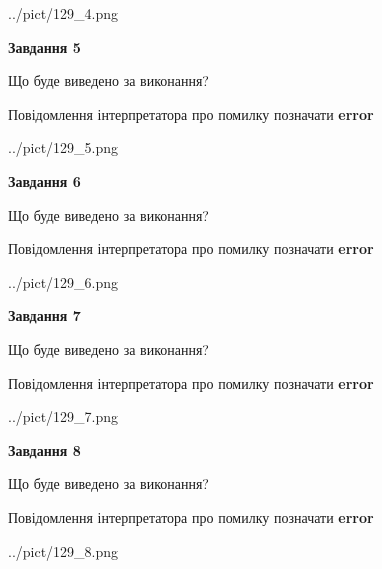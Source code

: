 \documentclass[12pt, ukrainian]{article}
\begin{document}
{\begin{center}
	{../pict/129_4.png}
\end{center}
\newpage

{\begin {center}\textbf{Завдання 5}\end {center}}\par
Що буде виведено за виконання? \par
Повідомлення інтерпретатора про помилку позначати \textbf{error}

\begin{center}
	{../pict/129_5.png}
\end{center}
\newpage

{\begin {center}\textbf{Завдання 6}\end {center}}\par
Що буде виведено за виконання? \par
Повідомлення інтерпретатора про помилку позначати \textbf{error}

\begin{center}
	{../pict/129_6.png}
\end{center}
\newpage

{\begin {center}\textbf{Завдання 7}\end {center}}\par
Що буде виведено за виконання? \par
Повідомлення інтерпретатора про помилку позначати \textbf{error}

\begin{center}
	{../pict/129_7.png}
\end{center}
\newpage

{\begin {center}\textbf{Завдання 8}\end {center}}\par
Що буде виведено за виконання? \par
Повідомлення інтерпретатора про помилку позначати \textbf{error}

\begin{center}
	{../pict/129_8.png}
\end{center}
\newpage

}
\end{document}
